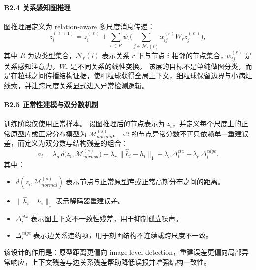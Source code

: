 \documentclass[UTF8,a4paper]{ctexart}
\begin{document}
\paragraph{B2.4 关系感知图推理}
图推理层定义为 relation-aware 多尺度消息传递：
\begin{equation}
  z_i^{(\ell+1)}
  =z_i^{(\ell)}+
  \sum_{r\in R}
  \psi_r\Bigg(
  \sum_{j\in\mathcal{N}_r(i)}
  \alpha_{ij}^{(r)}W_r z_j^{(\ell)}
  \Bigg),
\end{equation}
其中 $R$ 为边类型集合，$\mathcal{N}_r(i)$ 表示关系 $r$ 下与节点 $i$ 相邻的节点集合，$\alpha_{ij}^{(r)}$ 是关系感知注意力，$W_r$ 是不同关系的线性变换。
该层的目标不是单纯做图分类，而是在粒球之间传播结构证据，使粗粒球获得全局上下文，细粒球保留边界与小病灶线索，并让跨尺度关系显式进入异常检测逻辑。

\paragraph{B2.5 正常性建模与双分数机制}
训练阶段仅使用正常样本。
设图推理后的节点表示为 $z_i$，并定义每个尺度上的正常原型库或正常分布模型为 $\mathcal{M}_{normal}^{(s)}$。
v2 的节点异常分数不再只依赖单一重建误差，而定义为双分数与结构残差的组合：
\begin{equation}
  a_i=
  \lambda_d\,d\big(z_i,\mathcal{M}_{normal}^{(s)}\big)
  +\lambda_r\,\lVert \hat{h}_i-h_i\rVert_1
  +\lambda_c\,\Delta_i^{ctx}
  +\lambda_e\,\Delta_i^{edge}.
\end{equation}
其中：
\begin{itemize}
  \item $d(z_i,\mathcal{M}_{normal}^{(s)})$ 表示节点与正常原型库或正常高斯分布之间的距离。
  \item $\lVert \hat{h}_i-h_i\rVert_1$ 表示解码器重建误差。
  \item $\Delta_i^{ctx}$ 表示图上下文不一致性残差，用于抑制孤立噪声。
  \item $\Delta_i^{edge}$ 表示边关系违约项，用于刻画结构不连续或跨尺度不一致。
\end{itemize}
该设计的作用是：原型距离更偏向 image-level detection，重建误差更偏向局部异常响应，上下文残差与边关系残差帮助降低误报并增强结构一致性。
\end{document}
